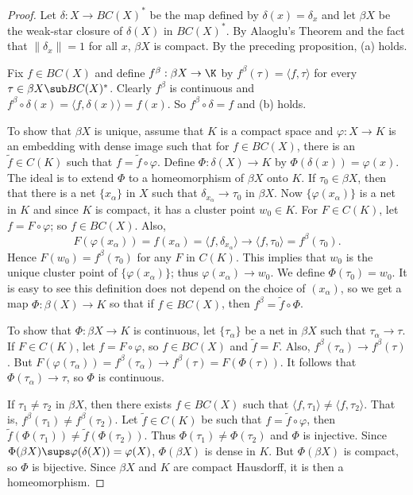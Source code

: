 \begin{proof}
Let $\delta:X\to BC(X)^*$ be the map defined by $\delta(x)=\delta_x$ and let $\beta X$ be the weak-star closure of $\delta(X)$ in $BC(X)^*$. By Alaoglu's Theorem and the fact that $\|\delta_x\|=1$ for all $x$, $\beta X$ is compact. By the preceding proposition, (a) holds.\par
Fix $f\in BC(X)$ and define $f^\beta:\beta  X\to \K$ by $f^\beta(\tau)=\langle f,\tau\rangle$ for every $\tau\in\beta X\sub BC(X)^*$. Clearly $f^\beta$ is continuous and $f^\beta\circ\delta(x)=\langle f,\delta(x)\rangle=f(x)$. So $f^\beta\circ \delta=f$ and (b) holds.\par
To show that $\beta X$ is unique, assume that $K$ is a compact space and $\varphi:X\to K$ is an embedding with dense image such that for $f\in BC(X)$, there is an $\widetilde{f}\in C(K)$ such that $f=\widetilde{f}\circ\varphi$. Define $\Phi:\delta(X)\to K$ by $\Phi(\delta(x))=\varphi(x)$. The ideal is to extend $\Phi$ to a homeomorphism of $\beta X$ onto $K$. If $\tau_0\in\beta X$, then that there is a net $\{x_\alpha\}$ in $X$ such that $\delta_{x_\alpha}\to\tau_0$ in $\beta X$. Now $\{\varphi(x_\alpha)\}$ is a net in $K$ and since $K$ is compact, it has a cluster point $w_0\in K$. For $F\in C(K)$, let $f=F\circ\varphi$; so $f\in BC(X)$. Also,
\[F(\varphi(x_\alpha))=f(x_\alpha)=\langle f,\delta_{x_\alpha}\rangle\to\langle f,\tau_0\rangle=f^\beta(\tau_0).\]
Hence $F(w_0)=f^\beta(\tau_0)$ for any $F$ in $C(K)$. This implies that $w_0$ is the unique cluster point of $\{\varphi(x_\alpha)\}$; thus $\varphi(x_\alpha)\to w_0$. We define $\Phi(\tau_0)=w_0$. It is easy to see this definition does not depend on the choice of $(x_\alpha)$, so we get a map $\Phi:\beta(X)\to K$ so that if $f\in BC(X)$, then $f^\beta=
\widetilde{f}\circ\Phi$.\par
To show that $\Phi:\beta X\to K$ is continuous, let $\{\tau_\alpha\}$ be a net in $\beta X$ such that $\tau_\alpha\to\tau$. If $F\in C(K)$, let $f=F\circ\varphi$, so $f\in BC(X)$ and $\widetilde{f}=F$. Also, $f^\beta(\tau_\alpha)\to f^\beta(\tau)$. But $F(\varphi(\tau_\alpha))=f^\beta(\tau_\alpha)\to f^\beta(\tau)=F(\Phi(\tau))$. It follows that $\Phi(\tau_\alpha)\to\tau$, so $\Phi$ is continuous.\par
If $\tau_1\neq\tau_2$ in $\beta X$, then there exists $f\in BC(X)$ such that $\langle f,\tau_1\rangle\neq\langle f,\tau_2\rangle$. That is, $f^\beta(\tau_1)\neq f^\beta(\tau_2)$. Let $\widetilde{f}\in C(K)$ be such that $f=\widetilde{f}\circ\varphi$, then $\widetilde{f}(\Phi(\tau_1))\neq\widetilde{f}(\Phi(\tau_2))$. Thus $\Phi(\tau_1)\neq\Phi(\tau_2)$ and $\Phi$ is injective. Since $\Phi(\beta X)\sups\varphi(\delta(X))=\varphi(X)$, $\Phi(\beta X)$ is dense in $K$. But $\Phi(\beta X)$ is compact, so $\Phi$ is bijective. Since $\beta X$ and $K$ are compact Hausdorff, it is then a homeomorphism.
\end{proof}
